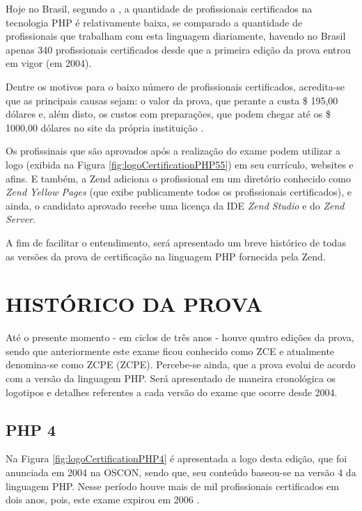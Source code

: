 Hoje no Brasil, segundo a , a
quantidade de profissionais certificados na tecnologia \acs{PHP} é relativamente
baixa, se comparado a quantidade de profissionais que trabalham com esta
linguagem diariamente, havendo no Brasil apenas 340 profissionais certificados
desde que a primeira edição da prova entrou em vigor (em 2004).

Dentre os motivos para o baixo número de profissionais certificados, acredita-se
que as principais causas sejam: o valor da prova, que perante a
 custa \$ 195,00 dólares e, além disto,
os custos com preparações, que podem chegar até os \$ 1000,00 dólares no site da
própria instituição \cite{websiteZendOnlineTraining}.

Os profissinais que são aprovados após a realização do exame podem utilizar a
logo (exibida na Figura \ref{fig:logoCertificationPHP55}) em seu currículo,
websites e afins. E também, a Zend adiciona o profissional em um
diretório conhecido como \textit{Zend Yellow Pages} (que exibe publicamente
todos os profissionais certificados), e ainda, o candidato aprovado recebe uma
licença da \acs{IDE} \textit{Zend Studio} e do \textit{Zend Server}.

A fim de facilitar o entendimento, será apresentado um breve histórico
de todas as versões da prova de certificação na linguagem \acs{PHP} fornecida
pela \acs{Zend}.

\section{HISTÓRICO DA PROVA}

Até o presente momento - em ciclos de três anos - houve quatro edições da
prova, sendo que anteriormente este exame ficou conhecido como \ac{ZCE} e
atualmente denomina-se como \acl{ZCPE} (\acs{ZCPE}). Percebe-se ainda, que a
prova evolui de acordo com a versão da linguagem \acs{PHP}. Será apresentado de
maneira cronológica os logotipos e detalhes referentes a cada versão do exame 
que ocorre desde 2004.

\subsection{PHP 4}

Na Figura \ref{fig:logoCertificationPHP4} é apresentada a logo desta edição, que
foi anunciada em 2004 na \ac{OSCON}, sendo que, seu conteúdo baseou-se na versão
4 da linguagem \acs{PHP}. Nesse período houve mais de mil profissionais
certificados em dois anos, pois, este exame expirou em 2006
\cite{entrevistaAriZCEBrasil}.

